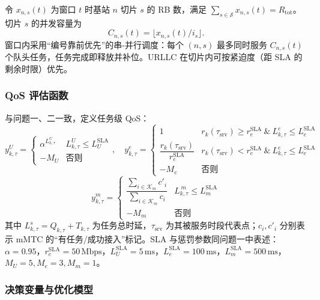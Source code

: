 令 $x_{n,s}(t)$ 为窗口 $t$ 时基站 $n$ 切片 $s$ 的 RB 数，满足 $\sum_{s\in\mathcal{S}}x_{n,s}(t)=R_{\text{tot}}$。切片 $s$ 的并发容量为
\begin{equation}
 C_{n,s}(t)=\big\lfloor x_{n,s}(t)/i_s\big\rfloor.
\end{equation}
窗口内采用“编号靠前优先”的串-并行调度：每个 $(n,s)$ 最多同时服务 $C_{n,s}(t)$ 个队头任务，任务完成即释放并补位。URLLC 在切片内可按紧迫度（距 SLA 的剩余时限）优先。

\subsubsection{QoS 评估函数}

与问题一、二一致，定义任务级 QoS：
\begin{equation}
 y^{U}_{k,\tau}=\begin{cases}
 \alpha^{L^{U}_{k,\tau}} & L^{U}_{k,\tau}\le L^{\text{SLA}}_{U}\\
 -M_U & \text{否则}
 \end{cases},\quad
 y^{e}_{k,\tau}=\begin{cases}
 1 & r_{k}(\tau_\text{srv})\ge r^{\text{SLA}}_{e}\ \&\ L^{e}_{k,\tau}\le L^{\text{SLA}}_{e}\\
 \dfrac{r_{k}(\tau_\text{srv})}{r^{\text{SLA}}_{e}} & r_{k}(\tau_\text{srv})< r^{\text{SLA}}_{e}\ \&\ L^{e}_{k,\tau}\le L^{\text{SLA}}_{e}\\
 -M_e & \text{否则}
 \end{cases}
\end{equation}
\begin{equation}
 y^{m}_{k,\tau}=\begin{cases}
 \dfrac{\sum\limits_{i\in\mathcal{K}_m}c'_i}{\sum\limits_{i\in\mathcal{K}_m}c_i} & L^{\,m}_{k,\tau}\le L^{\text{SLA}}_{m}\\
 -M_m & \text{否则}
 \end{cases}
\end{equation}
其中 $L^{s}_{k,\tau}=Q_{k,\tau}+T_{k,\tau}$ 为任务总时延，$\tau_\text{srv}$ 为其被服务时段代表点；$c_i,c'_i$ 分别表示 mMTC 的“有任务/成功接入”标记。SLA 与惩罚参数同问题一中表述：$\alpha=0.95$，$r^{\text{SLA}}_e=50\,\mathrm{Mbps}$，$L^{\text{SLA}}_{U}=5\,\mathrm{ms}$，$L^{\text{SLA}}_{e}=100\,\mathrm{ms}$，$L^{\text{SLA}}_{m}=500\,\mathrm{ms}$，$M_U=5, M_e=3, M_m=1$。

\subsubsection{决策变量与优化模型}

